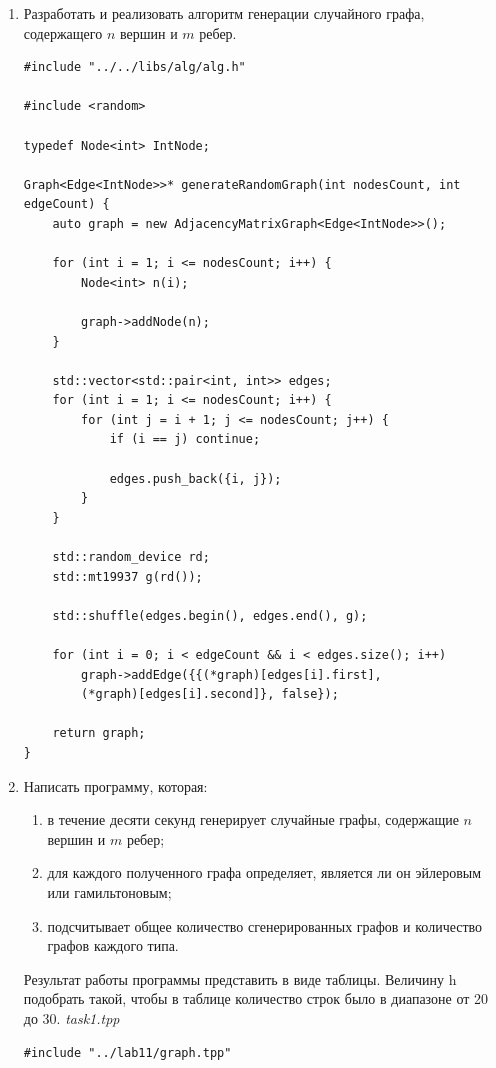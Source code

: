 \documentclass[a4paper,14pt]{extarticle}
\begin{document}
\begin{enumerate}[1.]
    \item Разработать и реализовать алгоритм генерации случайного графа,
          содержащего $n$ вершин и $m$ ребер.\\
          \begin{verbatim}
#include "../../libs/alg/alg.h"

#include <random>

typedef Node<int> IntNode;

Graph<Edge<IntNode>>* generateRandomGraph(int nodesCount, int edgeCount) {
    auto graph = new AdjacencyMatrixGraph<Edge<IntNode>>();

    for (int i = 1; i <= nodesCount; i++) {
        Node<int> n(i);

        graph->addNode(n);
    }

    std::vector<std::pair<int, int>> edges;
    for (int i = 1; i <= nodesCount; i++) {
        for (int j = i + 1; j <= nodesCount; j++) {
            if (i == j) continue;

            edges.push_back({i, j});
        }
    }

    std::random_device rd;
    std::mt19937 g(rd());

    std::shuffle(edges.begin(), edges.end(), g);

    for (int i = 0; i < edgeCount && i < edges.size(); i++) 
        graph->addEdge({{(*graph)[edges[i].first], 
        (*graph)[edges[i].second]}, false});

    return graph;
}
    \end{verbatim}
    \item Написать программу, которая:\\
          \begin{enumerate}[label=\asbuk*),ref=\asbuk*]
              \item в течение десяти секунд генерирует случайные графы, содержащие $n$ вершин и $m$ ребер;
              \item для каждого полученного графа определяет, является ли он эйлеровым или гамильтоновым;
              \item подсчитывает общее количество сгенерированных графов и количество графов каждого типа.
          \end{enumerate}
          Результат работы программы представить в виде таблицы. Величину h подобрать такой, чтобы в таблице количество
          строк было в диапазоне от 20 до 30.
          \textit{task1.tpp}
          \begin{verbatim}
#include "../lab11/graph.tpp"


\end{verbatim}
\end{enumerate}
\end{document}
